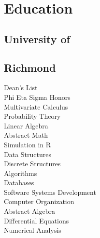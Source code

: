 \documentclass{resume}
\begin{document}

\bigskip

%
%

\begin{minipage}[t]{0.33\textwidth}


\section{Education}

\subsection{University of}
\subsection{Richmond}
Dean's List\\

Phi Eta Sigma Honors \\
{}
Multivariate Calculus\\
Probability Theory \\
Linear Algebra \\
Abstract Math\\
Simulation in R\\
Data Structures\\
Discrete Structures\\
Algorithms\\
Databases\\
Software Systems Development\\
Computer Organization\\
Abstract Algebra\\
Differential Equations\\
Numerical Analysis\\
\sectionsep




\end{minipage}
\end{document}
